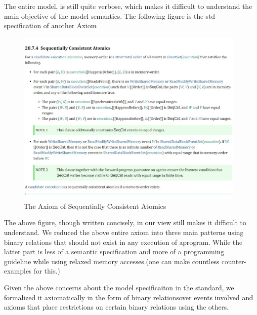     The entire model, is still quite verbose, which makes it difficult to understand the main objective of the model semantics. 
    The following figure is the std specification of another Axiom 
    \begin{figure}[H]
        \centering 
        \includegraphics[scale=0.6]{ECMAScriptMemoryModel/ECMAScriptStdSeqCnsAt.pdf}
        \caption{The Axiom of Sequentially Consistent Atomics}
    \end{figure}
    The above figure, though written concisely, in our view still makes it difficult to understand. 
    We reduced the above entire axiom into three main patterns using binary relations that should not exist in any execution of aprogram. 
    While the latter part is less of a semantic specification and more of a programming guideline while using relaxed memory accesses.(one can make countless counter-examples for this.) 

Given the above concerns about the model specificaiton in the standard, we formalized it axiomatically in the form of binary relationsover events involved and axioms that place restrictions on certain binary relations using the others. 

